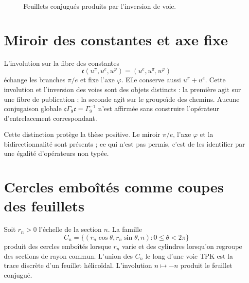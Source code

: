 \begin{figure}[htbp]
\centering
{}
\caption{Feuillets conjugués produits par l'inversion de voie.}
\label{espiral:fig:hojas-conjugadas}
\end{figure}

\section{Miroir des constantes et axe fixe}

L'involution sur la fibre des constantes
\[
 \mathfrak c(u^\pi,u^e,u^\varphi)
 =(u^e,u^\pi,u^\varphi)
\]
échange les branches \(\pi/e\) et fixe l'axe \(\varphi\). Elle conserve aussi \(u^\pi+u^e\). Cette involution et l'inversion des voies sont des objets distincts : la première agit sur une fibre de publication ; la seconde agit sur le groupoïde des chemins. Aucune conjugaison globale \(\mathfrak c\Gamma_9\mathfrak c=\Gamma_9^{-1}\) n'est affirmée sans construire l'opérateur d'entrelacement correspondant.

Cette distinction protège la thèse positive. Le miroir \(\pi/e\), l'axe \(\varphi\) et la bidirectionnalité sont présents ; ce qui n'est pas permis, c'est de les identifier par une égalité d'opérateurs non typée.

\section{Cercles emboîtés comme coupes des feuillets}

Soit \(r_n>0\) l'échelle de la section \(n\). La famille
\[
 C_n=\{(r_n\cos\theta,r_n\sin\theta,n):0\le\theta<2\pi\}
\]
produit des cercles emboîtés lorsque \(r_n\) varie et des cylindres lorsqu'on regroupe des sections de rayon commun. L'union des \(C_n\) le long d'une voie TPK est la trace discrète d'un feuillet hélicoïdal. L'involution \(n\mapsto-n\) produit le feuillet conjugué.
